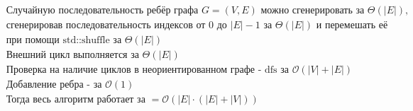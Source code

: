 \documentclass{report}
\begin{document}
\begin{equation*}
\begin{split}
    & \text{Случайную последовательность ребёр графа $G = (V, E)$ можно сгенерировать за $\Theta(|E|)$,} \\
    & \text{сгенерировав последовательность индексов от 0 до $|E| - 1$ за $\Theta(|E|)$ и перемешать её} \\
    & \text{при помощи std::shuffle за $\Theta(|E|)$} \\
    & \text{Внешний цикл выполняется за $\Theta(|E|)$} \\
    & \text{Проверка на наличие циклов в неориентированном графе - dfs за $\mathcal{O}(|V| + |E|)$} \\
    & \text{Добавление ребра - за $\mathcal{O}(1)$} \\
    & \text{Тогда весь алгоритм работает за }
        = \mathcal{O} \left( |E| \cdot \left(|E| + |V|\right) \right) \\
\end{split}
\end{equation*}
\end{document}
